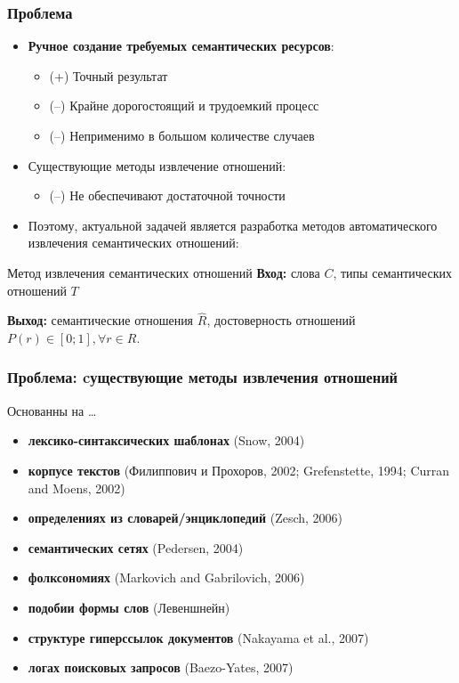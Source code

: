 \documentclass{beamer}
\begin{document}
\begin{frame}
\frametitle{Проблема}

\begin{itemize}
\item \textbf{Ручное создание требуемых семантических ресурсов}:
\begin{itemize}
\item (+) Точный результат 
\item (--) Крайне дорогостоящий и трудоемкий процесс
\item (--) Неприменимо в большом количестве случаев
\end{itemize}

\item Существующие методы извлечение отношений:
\begin{itemize}
  \item (--) Не обеспечивают достаточной точности  
  \end{itemize}

\item Поэтому, актуальной задачей является разработка методов автоматического извлечения семантических отношений:

\end{itemize}

\begin{block}{Метод извлечения семантических отношений}
\textbf{Вход:} слова $C$, типы семантических отношений $T$

\textbf{Выход:} семантические отношения $\hat{R}$, достоверность отношений $P(r) \in [0;1], \forall r \in R$.  
\end{block}

\end{frame}


\begin{frame}
\frametitle{Проблема: cуществующие методы извлечения отношений}

Основанны на \ldots 
\begin{itemize}
\item \textbf{лексико-синтаксических шаблонах} (Snow, 2004)
\item \textbf{корпусе текстов} (Филиппович и Прохоров, 2002; Grefenstette, 1994; Curran and Moens, 2002)
\item \textbf{определениях из словарей/энциклопедий} (Zesch, 2006)
\item \textbf{семантических сетях} (Pedersen, 2004)
\item \textbf{фолксономиях} (Markovich and Gabrilovich, 2006)
\item \textbf{подобии формы слов} (Левеншнейн)
\item \textbf{структуре гиперссылок документов} (Nakayama et al., 2007) 
\item \textbf{логах поисковых запросов} (Baezo-Yates, 2007)

\end{itemize}

\end{frame}
\end{document}
